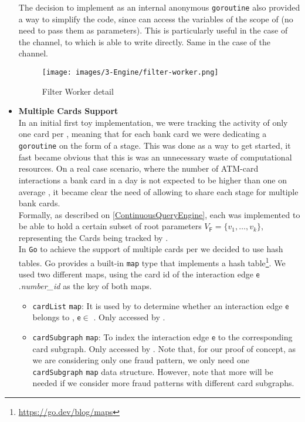 \begin{itemize}
    The decision to implement \FW as an internal anonymous \texttt{goroutine} also provided a way to simplify the code, since \FW can access the variables of the scope of \F (no need to pass them as parameters). This is particularly useful in the case of the \alertch channel, to which \FW is able to write directly. Same in the case of the \internaledgech channel.

    \begin{figure}[H]
      \centering
      \texttt{[image: images/3-Engine/filter-worker.png]}
      \caption{Filter Worker detail}
      \label{img:pipeline-schema}
    \end{figure}

    \item \textbf{Multiple Cards Support}\\
    In an initial first toy implementation, we were tracking the activity of only one card per \filter, meaning that for each bank card we were dedicating a \texttt{goroutine} on the form of a \filter stage. This was done as a way to get started, it fast became obvious that this is was an unnecessary waste of computational resources. On a real case scenario, where the number of ATM-card interactions a bank card in a day is not expected to be higher than one on average , it became clear the need of allowing to share each \filter stage for multiple bank cards.\\

    Formally, as described on \ref{ContinuousQueryEngine}, each \filter \F was implemented to be able to hold a certain subset of root parameters $V_{\mathsf{F}} = \{v_1,\ldots,v_k\}$, representing the Cards being tracked by \F.\\

    In \texttt{Go} to achieve the support of multiple cards per \filter we decided to use hash tables. Go provides a built-in \texttt{map} type that implements a hash table\footnote{\url{https://go.dev/blog/maps}}. We used two different maps, using the card id of the interaction edge $\mathsf{e}$.\emph{number\_id} as the key of both maps.

    \begin{itemize}
        \item \texttt{cardList} \texttt{map}: It is used by \F to determine whether an interaction edge $\mathsf{e}$ belongs to \F, $\mathsf{e} \in$ \F. Only accessed by \F.
        \item \texttt{cardSubgraph} \texttt{map}: To index the interaction edge $\mathsf{e}$ to the corresponding card subgraph.
        Only accessed by \FW. Note that, for our proof of concept, as we are considering only one fraud pattern, we only need one \texttt{cardSubgraph} \texttt{map} data structure. However, note that more will be needed if we consider more fraud patterns with different card subgraphs.
    \end{itemize}


\end{itemize}
